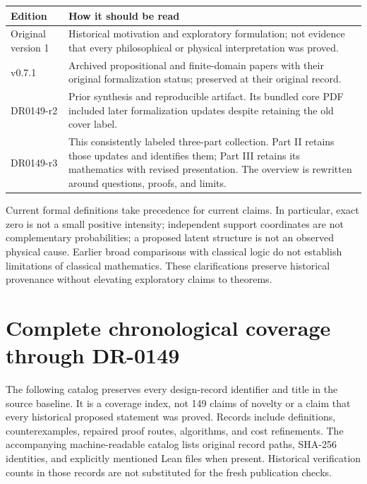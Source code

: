 \documentclass[11pt,a4paper]{article}
\begin{document}
\begin{center}\small
\begin{tabular}{p{.19\linewidth}p{.70\linewidth}}
\toprule Edition & How it should be read\\\midrule
Original version 1 & Historical motivation and exploratory formulation;
not evidence that every philosophical or physical interpretation was proved.\\
v0.7.1 & Archived propositional and finite-domain papers with their original
formalization status; preserved at their original record.\\
DR0149-r2 & Prior synthesis and reproducible artifact. Its bundled core PDF
included later formalization updates despite retaining the old cover label.\\
DR0149-r3 & This consistently labeled three-part collection. Part II retains
those updates and identifies them; Part III retains its mathematics with revised
presentation. The overview is rewritten around questions, proofs, and limits.\\
\bottomrule
\end{tabular}
\end{center}
Current formal definitions take precedence for current claims. In particular,
exact zero is not a small positive intensity; independent support coordinates
are not complementary probabilities; a proposed latent structure is not an
observed physical cause. Earlier broad comparisons with classical logic do not
establish limitations of classical mathematics. These clarifications preserve
historical provenance without elevating exploratory claims to theorems.

\section{Complete chronological coverage through DR-0149}
\label{app:catalog}
The following catalog preserves every design-record identifier and title in
the source baseline. It is a coverage index, not 149 claims of novelty or a
claim that every historical proposed statement was proved. Records include
definitions, counterexamples, repaired proof routes, algorithms, and cost
refinements. The accompanying machine-readable catalog lists original record
paths, SHA-256 identities, and explicitly mentioned Lean files when present.
Historical verification counts in those records are not substituted for the
fresh publication checks.




\end{document}

